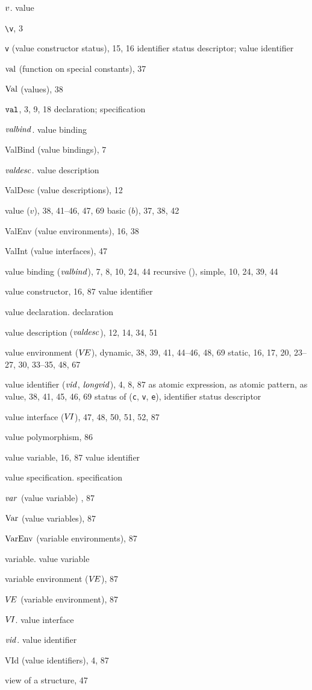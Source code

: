 \begin{theindex}
\item $v$. \see value
\item \verb+\v+, 3
\item {\tt v} (value constructor status), 15, 16
\subitem \seealso identifier status descriptor; value identifier
\item $\mathop{\rm val}\nolimits$ (function on special constants), 37
\item ${\rm Val}$ (values), 38
\item ${\tt val}$, 3, 9, 18
\subitem \seealso declaration; specification
\item ${\it valbind}$. \see value binding
\item ValBind (value bindings), 7
\item ${\it valdesc}$. \see value description
\item ValDesc (value descriptions), 12
\item value ($v$), 38, 41--46, 47, 69
\subitem basic ($b$), 37, 38, 42
\item ValEnv (value environments), 16, 38
\item ValInt (value interfaces), 47
\item value binding (${\it valbind}$), 7, 8, 10, 24, 44
\subitem recursive (), \recrefs
\subitem simple, 10, 24, 39, 44
\item value constructor, 16, 87
\subitem \seealso value identifier
\item value declaration. \see declaration
\item value description (${\it valdesc}$), 12, 14, 34, 51
\item value environment ($\mbox{$V\!E$}$),
\subitem dynamic, 38, 39, 41,  44--46, 48, 69
\subitem static, 16, 17, 20, 23--27, 30, 33--35, 48, 67
\item value identifier (${\it vid}$, ${\it longvid}$), 4, 8, 87
\subitem as atomic expression, \vidinatexprefs
\subitem as atomic pattern, \vidinatpatrefs
\subitem as value, 38, 41, 45, 46, 69
\subitem status of ({\tt c}, {\tt v}, {\tt e}), \see identifier status descriptor
\item value interface ($\mbox{$V\!I$}$), 47, 48, 50, 51, 52, 87
\item value polymorphism, 86
\item value variable, 16, 87
\subitem \seealso value identifier
\item value specification. \see specification
\item ${\it var}$ (value variable) , 87
\item ${\rm Var}$ (value variables), 87
\item ${\rm VarEnv}$ (variable environments), 87
\item variable. \see value variable
\item variable environment ($\mbox{$V\!E$}$), 87
\item $\mbox{$V\!E$}$ (variable environment), 87
\item $\mbox{$V\!I$}$. \see value interface
\item ${\it vid}$. \see value identifier
\item VId (value identifiers), 4, 87
\item view of a structure, 47
\indexspace


\end{theindex}
